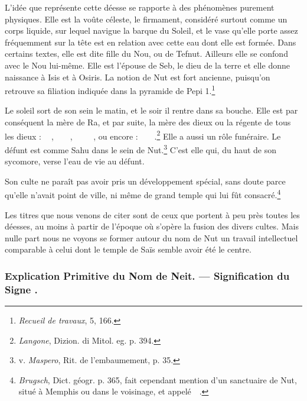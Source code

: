 \documentclass[a4paper, 11pt, oneside]{article}
\newcommand*\hieroAAAO{}
\newcommand*\hieroAACB{\raisebox{0.5ex}{}}
\newcommand*\hieroAACS{}
\newcommand*\hieroAACY{}
\newcommand*\hieroAAEK{}
\newcommand*\hieroAAEY{}
\newcommand*\hieroAAEZ{}
\newcommand*\hieroAAFS{}
\newcommand*\hieroAAHN{}
\newcommand*\hieroAAII{}
\newcommand*\hieroAAKP{}
\newcommand*\hieroAAMZ{}
\newcommand*\hieroAANC{}
\newcommand*\hieroAAPH{}
\newcommand*\hieroAAVQ{}
\newcommand*\hieroAAWJ{}
\newcommand*\hieroAAYG{}
\newcommand*\hieroABGF{}
\newcommand*\hieroABGR{}
\newcommand*\hieroABGS{}
\newcommand*\hieroABGT{\raisebox{0.3ex}{}}
\newcommand*\hieroABGU{}
\newcommand*\hieroABGV{}
\begin{document}
L'idée que représente cette déesse se rapporte à des phénomènes purement physiques. Elle est la voûte céleste, le firmament, considéré surtout comme un corps liquide, sur lequel navigue la barque du Soleil, et le vase qu'elle porte assez fréquemment sur la tête est en relation avec cette eau dont elle est formée. Dans certains textes, elle est dite fille du Nou, ou de Tefnut. Ailleurs elle se confond avec le Nou lui-même. Elle est l'épouse de Seb, le dieu de la terre et elle donne naissance à Isis et à Osiris. La notion de Nut est fort ancienne, puisqu'on retrouve sa filiation indiquée dans la pyramide de Pepi 1.\footnote{\emph{Recueil de travaux}, 5, 166.}

Le soleil sort de son sein le matin, et le soir il rentre dans sa bouche. Elle est par conséquent la mère de Ra, et par suite, la mère des dieux ou la régente de tous les dieux : $\hieroABGF\:\hieroAAFS\:\hieroAAPH\allowbreak\:\hieroAAWJ\:\hieroABGR$, $\hieroABGF\:\hieroAAMZ\:\hieroAANC\allowbreak\:\hieroAACB\:\hieroAACS\:\hieroAAEK\allowbreak\:\hieroAAEK\:\hieroAAEK$, $\hieroABGF\:\hieroAAEY\:\hieroAANC\allowbreak\:\hieroAACS\:\hieroAAEK\:\hieroAAEK\allowbreak\:\hieroAAEK\:\hieroABGS\:\hieroAAEZ\allowbreak\:\hieroAAWJ\:\hieroAAVQ$, ou encore : $\hieroABGF\:\hieroAAII\:\hieroAACY\allowbreak\:\hieroABGT\:\hieroABGU\:\hieroABGV\allowbreak\:\hieroAAKP\:\hieroAAYG$.\footnote{\emph{Langone}, Dizion. di Mitol. eg. p. 394.} Elle a aussi un rôle funéraire. Le défunt est comme Sahu dans le sein de Nut.\footnote{v. \emph{Maspero}, Rit. de l'embaumement, p. 35.} C'est elle qui, du haut de son sycomore, verse l'eau de vie au défunt.

Son culte ne paraît pas avoir pris un développement spécial, sans doute parce qu'elle n'avait point de ville, ni même de grand temple qui lui fût consacré.\footnote{\emph{Brugsch}, Dict. géogr. p. 365, fait cependant mention d'un sanctuaire de Nut, situé à Memphis ou dans le voisinage, et appelé $\hieroAAHN\:\hieroABGF\allowbreak\:\hieroAAII\:\hieroAACY$.}

Les titres que nous venons de citer sont de ceux que portent à peu près toutes les déesses, au moins à partir de l'époque où s'opère la fusion des divers cultes. Mais nulle part nous ne voyons se former autour du nom de Nut un travail intellectuel comparable à celui dont le temple de Saïs semble avoir été le centre.

\subsubsection{Explication Primitive du Nom de Neit. --- Signification du Signe $\hieroAAAO$.}
\end{document}
